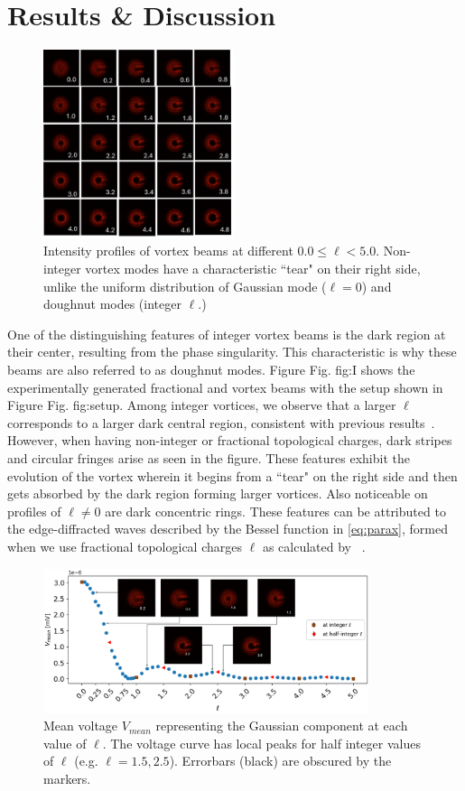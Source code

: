 \documentclass[10pt,a4paper,twoside]{article}
\renewcommand{\l}{\ell}
\renewcommand{\ref}[1]{Fig. #1}
\begin{document}
\section{Results \& Discussion}\label{sec:rnd}
\begin{figure}[h!]
    \centering
    \includegraphics[width=0.5\textwidth]{intensities.png}
    \caption{Intensity profiles of vortex beams at different $0.0 \le \l < 5.0$. Non-integer vortex modes have a characteristic ``tear" on their right side, unlike the uniform distribution of Gaussian mode ($\l = 0$) and doughnut modes (integer $\l$.) }\label{fig:I}
\end{figure}
One of the distinguishing features of integer vortex beams is the dark region at their center, resulting from the phase singularity. This characteristic is why these beams are also referred to as doughnut modes. Figure \ref{fig:I} shows the experimentally generated fractional and vortex beams with the setup shown in Figure \ref{fig:setup}. Among integer vortices, we observe that a larger $\l$ corresponds to a larger dark central region, consistent with previous results~\cite{padgett2015divergence}. However, when having non-integer or fractional topological charges, dark stripes and circular fringes arise as seen in the figure. These features exhibit the evolution of the vortex wherein it begins from a ``tear" on the right side and then gets absorbed by the dark region forming larger vortices. Also noticeable on profiles of $\l \ne 0$ are dark concentric rings. These features can be attributed to the edge-diffracted waves described by the Bessel function in \eqref{eq:parax}, formed when we use fractional topological charges $\l$ as calculated by ~\cite{Berry}. 
\begin{figure}[h!]
	\centering
	\includegraphics[width=0.85\textwidth]{SMF.png}
	\caption{Mean voltage $V_{mean}$ representing the Gaussian component at each value of $\l$. The voltage curve has local peaks for half integer values of $\l$ (e.g. $\l = 1.5, 2.5$). Errorbars (black) are obscured by the markers.}\label{fig:V}
\end{figure}
\end{document}
